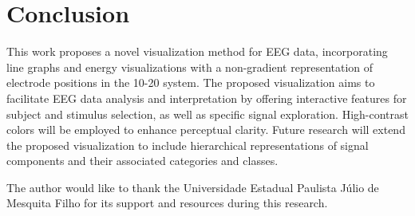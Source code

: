 \documentclass[format=sigconf]{acmart}
\begin{document}
	\section{Conclusion}
		\par This work proposes a novel visualization method for EEG data, incorporating line graphs and energy visualizations with a non-gradient representation of electrode positions in the 10-20 system. The proposed visualization aims to facilitate EEG data analysis and interpretation by offering interactive features for subject and stimulus selection, as well as specific signal exploration. High-contrast colors will be employed to enhance perceptual clarity. Future research will extend the proposed visualization to include hierarchical representations of signal components and their associated categories and classes.
	
	\begin{acks}
		The author would like to thank the Universidade Estadual Paulista Júlio de Mesquita Filho for its support and resources during this research.
	\end{acks}
	
	
	
	
\end{document}
